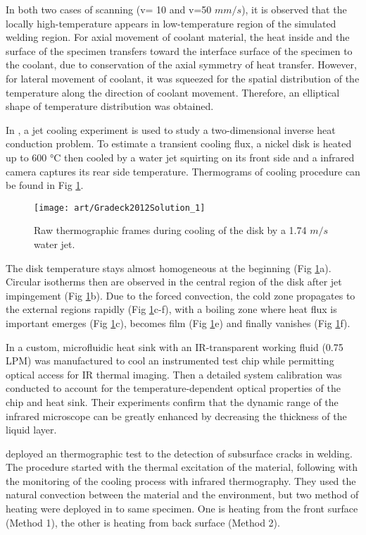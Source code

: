 In both two cases of scanning (v= 10 and v=50 $mm/s$), it is observed that the locally high-temperature appears in low-temperature region of the simulated welding region. For axial movement of coolant material, the heat inside and the surface of the specimen transfers toward the interface surface of the specimen to the coolant, due to conservation of the axial symmetry of heat transfer. However, for lateral movement of coolant, it was squeezed for the spatial distribution of the temperature along the direction of coolant movement. Therefore, an elliptical shape of temperature distribution was obtained.

In \citep{Gradeck2012Solution},  a jet cooling experiment is used to study a two-dimensional inverse heat conduction problem. To estimate a transient cooling flux, a nickel disk is heated up to 600 °C then cooled by a water jet squirting on its front side and a infrared camera captures its rear side temperature. Thermograms of cooling procedure can be found in Fig \ref{Gradeck2012Solution_1}.
\begin{figure}
	\centering
	\texttt{[image: art/Gradeck2012Solution\_1]}
	\caption{Raw thermographic frames during cooling of the disk by a 1.74 $ m/s $ water jet.}
	\label{Gradeck2012Solution_1}
\end{figure}
The disk temperature stays almost homogeneous at the beginning (Fig \ref{Gradeck2012Solution_1}a). Circular isotherms then are observed in the central region of the disk after jet impingement (Fig \ref{Gradeck2012Solution_1}b). Due to the forced convection, the cold zone propagates to the external regions rapidly (Fig \ref{Gradeck2012Solution_1}c-f), with a boiling zone where heat flux is important emerges (Fig \ref{Gradeck2012Solution_1}c), becomes film (Fig \ref{Gradeck2012Solution_1}e) and finally vanishes (Fig \ref{Gradeck2012Solution_1}f).

In \citep{2012-LewisHom} a custom, microfluidic  heat  sink  with  an  IR-transparent working  fluid  (0.75  LPM)  was  manufactured  to  cool  an instrumented test chip while permitting optical access for IR thermal imaging.  Then a detailed system calibration was conducted to account for the temperature-dependent optical properties of the chip and heat sink. Their experiments  confirm  that  the  dynamic  range  of  the infrared  microscope  can  be  greatly  enhanced  by decreasing the  thickness  of  the  liquid  layer. 

\citep{rodriguez2014cooling} deployed an thermographic test to the detection of subsurface cracks in welding. The procedure started with the thermal excitation of the material, following with the monitoring of the cooling process with infrared thermography. They used the natural convection between the material and the environment, but two method of heating were deployed in to same specimen. One is heating from the front surface (Method 1), the other is heating from back surface (Method 2). 

